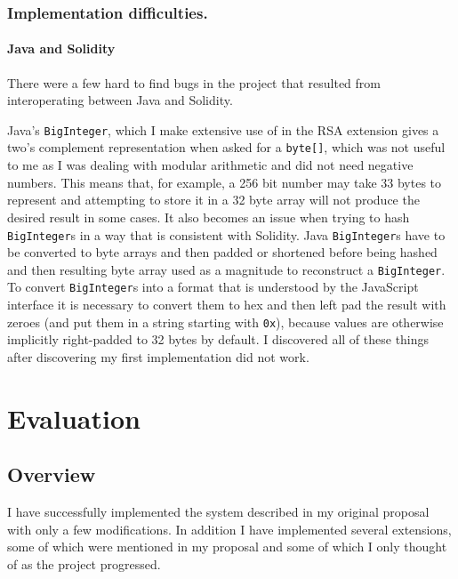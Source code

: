 \documentclass[12pt,a4paper,twoside,openright]{report}
\begin{document}
\subsection{Implementation difficulties.}

\subsubsection{Java and Solidity}

There were a few hard to find bugs in the project that resulted from interoperating between Java and Solidity.

Java's \texttt{BigInteger}, which I make extensive use of in the RSA extension gives a two's complement representation
when asked for a \texttt{byte[]}, which was not useful to me as I was dealing with modular arithmetic and did not need negative numbers.
This means that, for example, a 256 bit number may take 33 bytes to represent and attempting to store it in a 32 byte array
will not produce the desired result in some cases.
It also becomes an issue when trying to hash \texttt{BigInteger}s in a way that is consistent with Solidity.
Java \texttt{BigInteger}s have to be converted to byte arrays and then padded or shortened before being hashed and then resulting byte array
used as a magnitude to reconstruct a \texttt{BigInteger}.
To convert \texttt{BigInteger}s into a format that is understood by the JavaScript interface it is necessary to convert them to hex and then left pad the result with zeroes
(and put them in a string starting with \texttt{0x}), because values are otherwise implicitly right-padded to 32 bytes by default.
I discovered all of these things %
after discovering my first implementation did not work.






\chapter{Evaluation}

\section{Overview}

I have successfully implemented the system described in my original proposal with only a few modifications.
In addition I have implemented several extensions, some of which were mentioned in my proposal and some of which
I only thought of as the project progressed.
\end{document}

